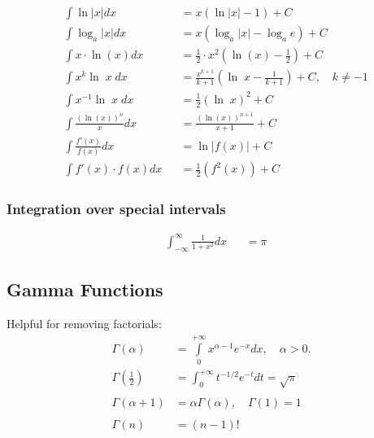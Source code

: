 \begin{footnotesize}
\begin{align*}
         & \int \ln\vert x\vert dx               &  & =x(\ln\vert x \vert -1)+C                                                         \\
         & \int \log_a\vert x \vert dx           &  & =x(\log_a\vert x\vert -\log_a e)+C                                                \\
         & \int x \cdot \ln(x) dx                &  & =\frac 1 2 \cdot x^2(\ln(x)-\frac{1}{2})+C                                        \\
         & \int x^k \ln\; x \;dx                 &  & =\frac{x^{k+1}}{k+1}\left(\ln\; x-\frac{1}{k+1}\right)+C,\quad k\neq -1           \\
         & \int x^{-1}\ln\; x \; dx              &  & =\frac{1}{2}{(\ln\; x)}^2+C                                                       \\
         & \int \frac{{(\ln(x))}^n}{x}dx         &  & =\frac{{(\ln(x))}^{n+1}}{x+1}+C                                                   \\
         & \int \frac{f'(x)}{f(x)}dx             &  & =\ln\vert f(x) \vert +C                                                           \\
         & \int f'(x) \cdot f(x) dx              &  & = \frac{1}{2}(f^2(x))+C
    \end{align*}
\end{footnotesize}

\subsubsection{Integration over special intervals}
\begin{align*}
     & \int_{-\infty}^{\infty}\frac{1}{1+x^2}dx &  & =\pi
\end{align*}

\subsection{Gamma Functions}
Helpful for removing factorials:
\begin{align*}
    \Gamma(\alpha)             & =\int\limits_{0}^{+\infty}x^{\alpha-1}e^{-x}dx,\quad\alpha>0. \\
    \Gamma\left(\frac12\right) & =\int_0^{+\infty}t^{-1/2}e^{-t}dt=\sqrt{\pi}                  \\ \\
    \Gamma(\alpha+1)           & =\alpha\Gamma(\alpha),\quad \Gamma(1)=1                       \\ \\
    \Gamma(n)                  & =(n-1)!
\end{align*}

